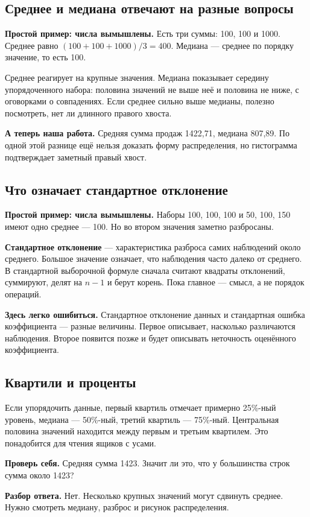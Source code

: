 \documentclass[12pt,a4paper]{article}
\newcommand{\toy}[1]{\par\textbf{Простой пример: числа вымышлены.} #1\par}
\newcommand{\ours}[1]{\par\textbf{А теперь наша работа.} #1\par}
\newcommand{\check}[2]{\par\textbf{Проверь себя.} #1\par\textbf{Разбор ответа.} #2\par}
\newcommand{\pitfall}[1]{\par\textbf{Здесь легко ошибиться.} #1\par}
\begin{document}
\subsection{Среднее и медиана отвечают на разные вопросы}

\toy{Есть три суммы: 100, 100 и 1000. Среднее равно $(100+100+1000)/3=400$. Медиана --- среднее по порядку значение, то есть 100.}

Среднее реагирует на крупные значения. Медиана показывает середину упорядоченного набора: половина значений не выше неё и половина не ниже, с оговорками о совпадениях. Если среднее сильно выше медианы, полезно посмотреть, нет ли длинного правого хвоста.

\ours{Средняя сумма продаж 1422,71, медиана 807,89. По одной этой разнице ещё нельзя доказать форму распределения, но гистограмма подтверждает заметный правый хвост.}

\subsection{Что означает стандартное отклонение}

\toy{Наборы 100, 100, 100 и 50, 100, 150 имеют одно среднее --- 100. Но во втором значения заметно разбросаны.}

\textbf{Стандартное отклонение} --- характеристика разброса самих наблюдений около среднего. Большое значение означает, что наблюдения часто далеко от среднего. В стандартной выборочной формуле сначала считают квадраты отклонений, суммируют, делят на $n-1$ и берут корень. Пока главное --- смысл, а не порядок операций.

\pitfall{Стандартное отклонение данных и стандартная ошибка коэффициента --- разные величины. Первое описывает, насколько различаются наблюдения. Второе появится позже и будет описывать неточность оценённого коэффициента.}

\subsection{Квартили и проценты}

Если упорядочить данные, первый квартиль отмечает примерно 25\%-ный уровень, медиана --- 50\%-ный, третий квартиль --- 75\%-ный. Центральная половина значений находится между первым и третьим квартилем. Это понадобится для чтения ящиков с усами.

\check{Средняя сумма 1423. Значит ли это, что у большинства строк сумма около 1423?}{Нет. Несколько крупных значений могут сдвинуть среднее. Нужно смотреть медиану, разброс и рисунок распределения.}
\end{document}
